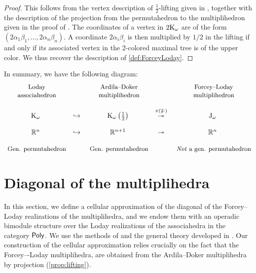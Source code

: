 \documentclass[twoside, 11pt]{amsart}
\theoremstyle{remark}
\begin{document}
\begin{proof} 
  This follows from the vertex description of $\tfrac{1}{2}$-lifting given in \cite[Definition 3.5.3]{Doker11}, together with the description of the projection from the permutahedron to the multiplihedron given in the proof of \cite[Theorem 3.3.6]{Doker11}. 
  The coordinates of a vertex in $2 \mathrm{K}_\omega$ are of the form $(2\alpha_1\beta_1, \ldots, 2\alpha_n\beta_n)$. 
  A coordinate $2\alpha_i\beta_i$ is then multiplied by $1/2$ in the lifting if and only if its associated vertex in the 2-colored maximal tree is of the upper color. 
  We thus recover the description of \cref{def:ForceyLoday}.
\end{proof}

In summary, we have the following diagram:
\medskip
\begin{equation*}
\begin{matrix}
  $ \small  \text{Loday}$ & & $ \small \text{Ardila--Doker}$ &  & $ \small \text{Forcey--Loday}$ \\
  $ \small  \text{associahedron}$ & & $ \small \text{multiplihedron}$ &  & $ \small \text{multiplihedron}$ \\
  & &  &  & \\
  \K_\omega & \hookrightarrow & \K_\omega \left(\tfrac{1}{2}\right) & \overset{\pi ( 2 \cdot ) }{\twoheadrightarrow} & \J_\omega \\
   & &  &  & \\
  \RR^n & \hookrightarrow & \RR^{n+1} & \twoheadrightarrow & \RR^n \\
  & &  &  & \\
  $ \small \text{Gen. permutahedron}$ & & $ \small \text{Gen. permutahedron}$ &  & $ \small \textit{Not}\text{ a gen. permutahedron}$
\end{matrix}
\end{equation*}


\section{Diagonal of the multiplihedra}
\label{sec:II}

In this section, we define a cellular approximation of the diagonal of the Forcey--Loday realizations of the multiplihedra, and we endow them with an operadic bimodule structure over the Loday realizations of the associahedra in the category $\mathsf{Poly}$. 
We use the methods of \cite{MTTV19} and the general theory developed in \cite{LA21}.
Our construction of the cellular approximation relies crucially on the fact that the Forcey–-Loday multiplihedra, are obtained from the Ardila–Doker multiplihedra by projection (\cref{prop:lifting}).
\end{document}

